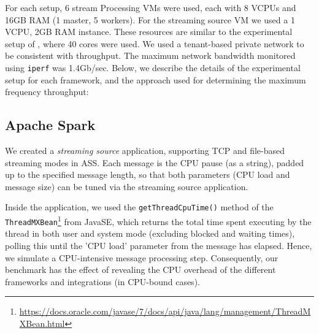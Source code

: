 \documentclass[conference]{IEEEtran}
\begin{document}
For each setup, 6 stream Processing VMs were used, each with 8 VCPUs and 16GB RAM (1 master, 5 workers). For the streaming source VM we used a 1 VCPU, 2GB RAM instance.  
These resources are similar to the experimental setup of \cite{xinApacheSparkFastest2014}, where 40 cores were used.
We used a tenant-based private network to be consistent with throughput. The maximum network bandwidth monitored using \texttt{iperf} was 1.4Gb/sec. 
Below, we describe the details of the experimental setup for each framework, and the approach used for determining the maximum frequency throughput:

\subsection{Apache Spark}
We created a \emph{streaming source} application, supporting TCP and file-based streaming modes in ASS. 
Each message is the CPU pause (as a string), padded up to the specified message length, so that both parameters (CPU load and message size) can be tuned via the streaming source application. 

Inside the application, we used the \texttt{getThreadCpuTime()} method of the \texttt{ThreadMXBean}\footnote{\url{https://docs.oracle.com/javase/7/docs/api/java/lang/management/ThreadMXBean.html}} from JavaSE, which returns the total time spent executing by the thread in both user and system mode (excluding blocked and waiting times), polling this until the 'CPU load' parameter from the message has elapsed. Hence, we simulate a CPU-intensive message processing step. Consequently, our benchmark has the effect of revealing the CPU overhead of the different frameworks and integrations (in CPU-bound cases). 
\end{document}

